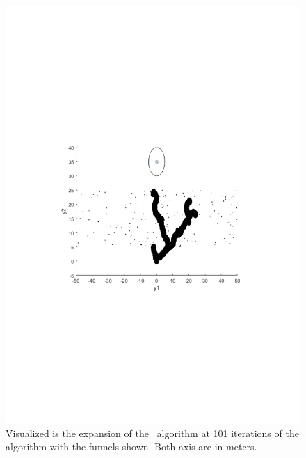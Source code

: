 \begin{figure}[!t]
    \centering
    \includegraphics[scale=.6, trim={4.5cm, 9cm, 5cm, 7cm}, clip]{figures/experiments/rrtfunnel-101samples.pdf}
    \caption[The expansion of the \rrtfunnel algorithm at 1, and 101 iterations]{Visualized is the expansion of the \rrtfunnel~algorithm at 101 iterations of the algorithm with the funnels shown. Both axis are in meters.}
    \label{fig:algorithm_with_funnel}
\end{figure}

